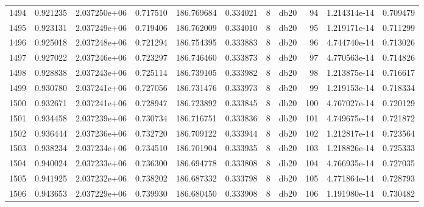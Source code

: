 \begin{tabular}{lrrrrrrlrrr}
1494 &    0.921235 &        2.037250e+06 &  0.717510 &              186.769684 &    0.334021 &       8 &         db20 &     94 &   1.214314e-14 &      0.709479 \\
1495 &    0.923131 &        2.037249e+06 &  0.719406 &              186.762009 &    0.334010 &       8 &         db20 &     95 &   1.219171e-14 &      0.711299 \\
1496 &    0.925018 &        2.037248e+06 &  0.721294 &              186.754395 &    0.333883 &       8 &         db20 &     96 &   4.744740e-14 &      0.713026 \\
1497 &    0.927022 &        2.037246e+06 &  0.723297 &              186.746460 &    0.333873 &       8 &         db20 &     97 &   4.770563e-14 &      0.714826 \\
1498 &    0.928838 &        2.037243e+06 &  0.725114 &              186.739105 &    0.333982 &       8 &         db20 &     98 &   1.213875e-14 &      0.716617 \\
1499 &    0.930780 &        2.037241e+06 &  0.727056 &              186.731476 &    0.333973 &       8 &         db20 &     99 &   1.219153e-14 &      0.718334 \\
1500 &    0.932671 &        2.037241e+06 &  0.728947 &              186.723892 &    0.333845 &       8 &         db20 &    100 &   4.767027e-14 &      0.720129 \\
1501 &    0.934458 &        2.037239e+06 &  0.730734 &              186.716751 &    0.333836 &       8 &         db20 &    101 &   4.749675e-14 &      0.721872 \\
1502 &    0.936444 &        2.037236e+06 &  0.732720 &              186.709122 &    0.333944 &       8 &         db20 &    102 &   1.212817e-14 &      0.723564 \\
1503 &    0.938234 &        2.037234e+06 &  0.734510 &              186.701904 &    0.333935 &       8 &         db20 &    103 &   1.218826e-14 &      0.725333 \\
1504 &    0.940024 &        2.037233e+06 &  0.736300 &              186.694778 &    0.333808 &       8 &         db20 &    104 &   4.766935e-14 &      0.727035 \\
1505 &    0.941925 &        2.037232e+06 &  0.738202 &              186.687332 &    0.333798 &       8 &         db20 &    105 &   4.771864e-14 &      0.728793 \\
1506 &    0.943653 &        2.037229e+06 &  0.739930 &              186.680450 &    0.333908 &       8 &         db20 &    106 &   1.191980e-14 &      0.730482 \\

\end{tabular}
